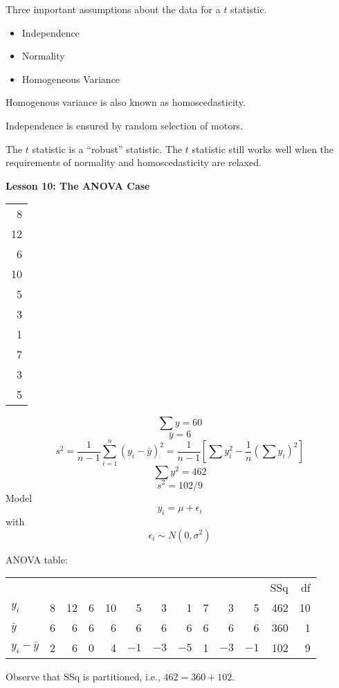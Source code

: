 \documentclass[12pt]{article}
\begin{document}
Three important assumptions about the data for a $t$ statistic.
\begin{itemize}
\item
Independence
\item
Normality
\item
Homogeneous Variance
\end{itemize}
Homogenous variance is also known as homoscedasticity.

Independence is ensured by random selection of motors.

The $t$ statistic is a ``robust'' statistic.
The $t$ statistic still works well
when the requirements of normality and homoscedasticity are relaxed.

{\bf Lesson 10: The ANOVA Case}

\begin{center}
\begin{tabular}{|r|}
\hline
8\\
12\\
6\\
10\\
5\\
3\\
1\\
7\\
3\\
5\\
\hline
\end{tabular}
\end{center}
$$\sum y=60$$
$$\bar y=6$$
$$s^2=\frac{1}{n-1}\sum_{i=1}^n(y_i-\bar y)^2
=\frac{1}{n-1}\left[\sum y_i^2-\frac{1}{n}\left(\sum y_i\right)^2\right]$$
$$\sum y^2=462$$
$$s^2=102/9$$
Model
$$y_i=\mu+\epsilon_i$$
with
$$\epsilon_i\sim N(0,\sigma^2)$$

ANOVA table:

\begin{center}
\begin{tabular}{|lrrrrrrrrrrrr|}
\hline
      &   &    &   &    &   &   &   &   &   &   & SSq & df\\
$y_i$ & 8 & 12 & 6 & 10 & 5 & 3 & 1 & 7 & 3 & 5 & 462 & 10\\
$\bar y$ & 6 & 6 & 6 & 6 & 6 & 6 & 6 & 6 & 6 & 6 & 360 & 1\\
$y_i-\bar y$ & 2 & 6 & 0 & 4 & $-1$ & $-3$ & $-5$ & 1 & $-3$ & $-1$ & 102 & 9\\
\hline
\end{tabular}
\end{center}

Observe that SSq is partitioned, i.e., $462=360+102$.
\end{document}
